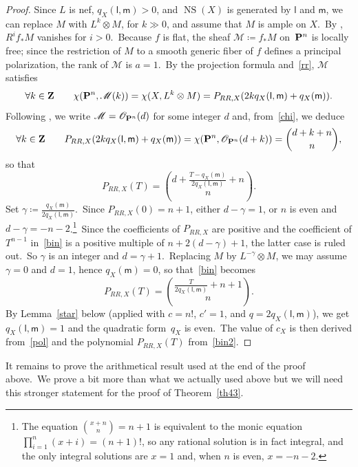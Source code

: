 \documentclass[12pt]{amsart}
\def\cO{\mathscr{O}}
\def\cM{\mathscr{M}}
\def\Z{{\bf Z}}
\def\P{{\bf P}}
\DeclareMathOperator{\NS}{NS}
\theoremstyle{remark}
\def\lll{\ensuremath{\mathsf l}}
\def\mm{\ensuremath{\mathsf m}}
\begin{document}
\begin{proof}
Since $L$ is nef, $q_X(\lll,\mm)>0$, and $\NS(X)$ is generated by $\lll$ and $\mm$, we can replace $M$ with $L^k\otimes M$, for $k\gg0$, and assume that $M$ is ample on $X$.\  By \cite[Theorem~10.32]{kol}, $R^if_*M$ vanishes for $i>0$.\ Because $f$ is flat,     the sheaf $\cM\coloneqq f_*M$ on~$\P^n$ is locally free; since
the restriction of $M$ to a smooth generic fiber of $f$ defines a principal polarization, the rank of $\cM$ is  $a=1$.\
By the projection formula and~\eqref{rr}, $\cM$ satisfies
\begin{equation}\label{chi}
\forall k\in\Z\qquad\chi(\P^n, \cM(k))=\chi(X,  L^k\otimes M) =P_{RR,X}(2kq_X(\lll,\mm)+q_X(\mm)) .
\end{equation}
Following \cite[Section~3]{ort}, we write $\cM=\cO_{\P^n}(d)$ for some integer $d$ and, from~\eqref{chi}, we deduce
\[
\forall k\in\Z\qquad P_{RR,X}(2kq_X(\lll,\mm)+q_X(\mm))=\chi(\P^n,\cO_{\P^n}(d+k))=\binom{d+k+n}{n},
\]
so that
\begin{equation}\label{bin}
P_{RR,X}(T)= \binom{d+\frac{T-q_X(\mm)}{2 q_X(\lll,\mm)}+n}{n}.
\end{equation}
Set $\gamma\coloneqq \frac{ q_X(\mm)}{2 q_X(\lll,\mm)} $.\ Since $P_{RR,X}(0)=n+1$, either $d-\gamma=1$, or $n$ is even and $d-\gamma=-n-2$.\footnote{The equation $\binom{x+n}{n}= n+1$ is equivalent to the monic equation $\prod_{i=1}^n(x+i)= (n+1)! $, so any rational solution is in fact integral, and the only integral solutions are $x=1$ and, when $n$ is even, $x=-n-2 $.}\
Since the coefficients of $P_{RR,X}$ are positive and the coefficient of $T^{n-1}$ in~\eqref{bin} is a positive multiple of $ n+2(d-\gamma) +1$, the latter case is ruled out.\
So $\gamma$ is an integer and $d=\gamma+1$.\ Replacing $M$ by $L^{-\gamma}\otimes M$, we may  assume $\gamma=0$ and $d=1$, hence $q_X(\mm)=0$, so that~\eqref{bin} becomes
\begin{equation}\label{bin2}
P_{RR,X}(T)= \binom{\frac{T}{2 q_X(\lll,\mm)}+n+1}{n}.
\end{equation}
By  Lemma~\ref{star} below (applied with $c=n!$, $c'=1$, and $q=2 q_X(\lll,\mm)$), we get    $q_X(\lll,\mm)=1$ and the quadratic form~$q_X$ is even.\
The value of $c_X$ is then derived from~\eqref{pol} and the polynomial $P_{RR,X}(T)$ from~\eqref{bin2}.
\end{proof}

It remains to prove the arithmetical result   used at the end of the proof above.\ We prove a bit more  than what we actually used above but we will need this stronger statement for the proof of Theorem~\ref{th43}.
\end{document}

